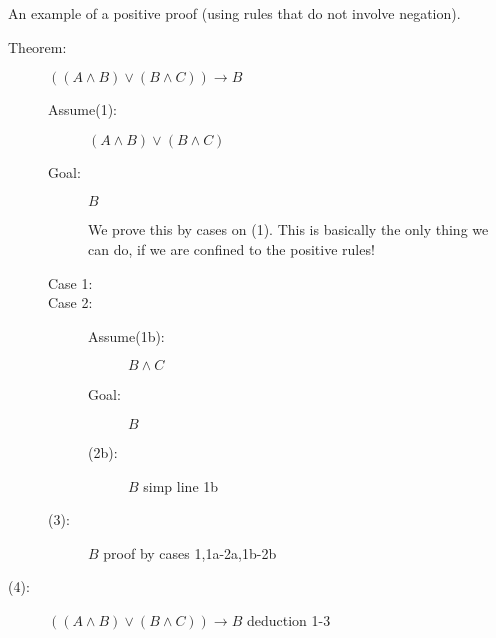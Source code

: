 \documentclass[12pt]{article}
\begin{document}
An example of a positive proof (using rules that do not involve negation).

\begin{description}

\item[Theorem:]  $((A \wedge B) \vee (B \wedge C)) \rightarrow B$

\begin{description}

\item[Assume(1):]  $(A \wedge B) \vee (B \wedge C)$

\item[Goal:]  $B$

We prove this by cases on (1).  This is basically the only thing we can do, if we are confined to the positive rules!

\item[Case 1:]



\item[Case 2:]  

\begin{description}

\item[Assume(1b):]  $B \wedge C$

\item[Goal:]  $B$

\item[(2b):]  $B$  simp line 1b
\end{description}

\item[(3):]  $B$ proof by cases 1,1a-2a,1b-2b

\end{description}

\item[(4):]  $((A \wedge B) \vee (B \wedge C)) \rightarrow B$ deduction 1-3

\end{description}
\end{document}
